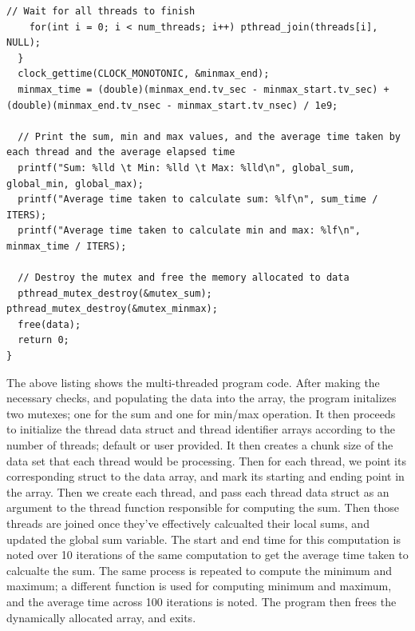 \documentclass{article}
\theoremstyle{mytheoremstyle}
\theoremstyle{mytheoremstyle}
\theoremstyle{myproblemstyle}
\begin{document}
\begin{lstlisting}[caption={Multi-Threaded Program} label={lst:multi}]
    // Wait for all threads to finish
    for(int i = 0; i < num_threads; i++) pthread_join(threads[i], NULL);
  }
  clock_gettime(CLOCK_MONOTONIC, &minmax_end);
  minmax_time = (double)(minmax_end.tv_sec - minmax_start.tv_sec) + (double)(minmax_end.tv_nsec - minmax_start.tv_nsec) / 1e9;

  // Print the sum, min and max values, and the average time taken by each thread and the average elapsed time
  printf("Sum: %lld \t Min: %lld \t Max: %lld\n", global_sum, global_min, global_max);
  printf("Average time taken to calculate sum: %lf\n", sum_time / ITERS);
  printf("Average time taken to calculate min and max: %lf\n", minmax_time / ITERS);

  // Destroy the mutex and free the memory allocated to data
  pthread_mutex_destroy(&mutex_sum); pthread_mutex_destroy(&mutex_minmax);
  free(data);
  return 0;
}
\end{lstlisting}
The above listing shows the multi-threaded program code. After making the necessary checks, and populating the data into the array, the program initalizes two mutexes; one for the sum and one for min/max operation. It then proceeds to initialize the thread data struct and thread identifier arrays according to the number of threads; default or user provided. It then creates a chunk size of the data set that each thread would be processing. Then for each thread, we point its corresponding struct to the data array, and mark its starting and ending point in the array. Then we create each thread, and pass each thread data struct as an argument to the thread function responsible for computing the sum. Then those threads are joined once they've effectively calcualted their local sums, and updated the global sum variable. The start and end time for this computation is noted over 10 iterations of the same computation to get the average time taken to calcualte the sum. The same process is repeated to compute the minimum and maximum; a different function is used for computing minimum and maximum, and the average time across 100 iterations is noted. The program then frees the dynamically allocated array, and exits.
\end{document}
